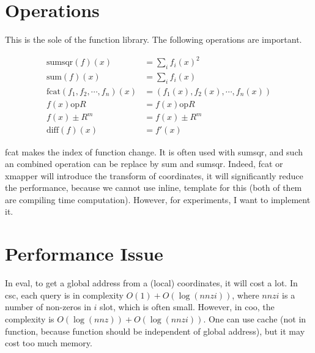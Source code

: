 \documentclass[9pt,twocolumn]{extarticle}
\begin{document}

\section{Operations}
This is the sole of the function library.  The following operations
are important.

\begin{equation}
  \begin{split}
    \mbox{sumsqr}(f)(x) &= \sum_i f_i(x)^2\\
    \mbox{sum}(f)(x) &= \sum_i f_i(x)\\
    \mbox{fcat}(f_1, f_2, \cdots, f_n)(x) &= (f_1(x), f_2(x), \cdots, f_n(x))\\
    f(x) \mbox{op} R &= f(x) \mbox{op} R\\
    f(x) \pm R^m &= f(x) \pm R^m\\
    \mbox{diff}(f)(x) &= f'(x)
  \end{split}
\end{equation}

fcat makes the index of function change.  It is often used with
sumsqr, and such an combined operation can be replace by sum and
sumsqr.  Indeed, fcat or xmapper will introduce the transform of
coordinates, it will significantly reduce the performance, because we
cannot use inline, template for this (both of them are compiling time
computation).  However, for experiments, I want to implement it.

\section{Performance Issue}
In eval, to get a global address from a (local) coordinates, it will
cost a lot.  In csc, each query is in complexity $O(1)+O(\log(nnzi))$,
where $nnzi$ is a number of non-zeros in $i$ slot, which is often
small.  However, in coo, the complexity is
$O(\log(nnz))+O(\log(nnzi))$.  One can use cache (not in function,
because function should be independent of global address), but it may
cost too much memory.
\end{document}
